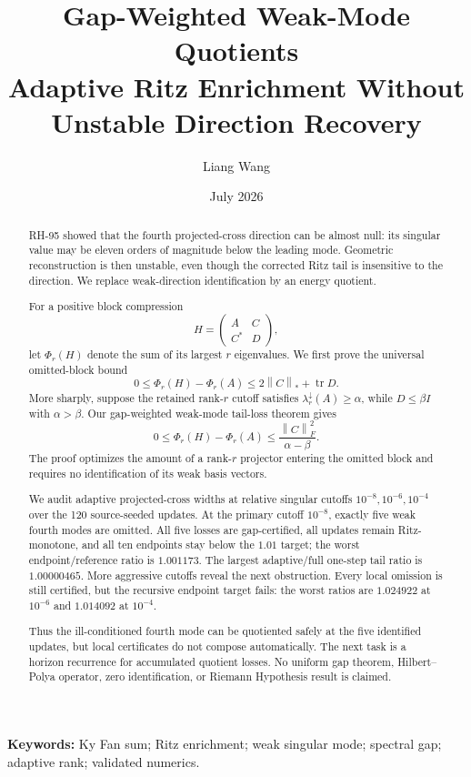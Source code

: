 \documentclass[11pt]{article}
\title{Gap-Weighted Weak-Mode Quotients\\
\large Adaptive Ritz Enrichment Without Unstable Direction Recovery}
\author{Liang Wang}
\date{July 2026}
\theoremstyle{definition}
\theoremstyle{remark}
\newcommand{\norm}[1]{\left\lVert#1\right\rVert}
\newcommand{\tr}{\operatorname{tr}}
\begin{document}
\maketitle

\begin{abstract}
RH-95 showed that the fourth projected-cross direction can be almost null:
its singular value may be eleven orders of magnitude below the leading mode.
Geometric reconstruction is then unstable, even though the corrected Ritz
tail is insensitive to the direction.  We replace weak-direction
identification by an energy quotient.

For a positive block compression
\[
 H=\begin{pmatrix}A&C\\C^*&D\end{pmatrix},
\]
let $\Phi_r(H)$ denote the sum of its largest $r$ eigenvalues.  We first prove
the universal omitted-block bound
\[
 0\le\Phi_r(H)-\Phi_r(A)
 \le 2\norm C_*+\tr D.
\]
More sharply, suppose the retained rank-$r$ cutoff satisfies
$\lambda_r^\downarrow(A)\ge\alpha$, while $D\le\beta I$ with
$\alpha>\beta$.  Our gap-weighted weak-mode tail-loss theorem gives
\[
 0\le\Phi_r(H)-\Phi_r(A)
 \le\frac{\norm C_F^2}{\alpha-\beta}.
\]
The proof optimizes the amount of a rank-$r$ projector entering the omitted
block and requires no identification of its weak basis vectors.

We audit adaptive projected-cross widths at relative singular cutoffs
$10^{-8},10^{-6},10^{-4}$ over the 120 source-seeded updates.  At the primary
cutoff $10^{-8}$, exactly five weak fourth modes are omitted.  All five losses
are gap-certified, all updates remain Ritz-monotone, and all ten endpoints
stay below the $1.01$ target; the worst endpoint/reference ratio is
$1.001173$.  The largest adaptive/full one-step tail ratio is $1.00000465$.
More aggressive cutoffs reveal the next obstruction.  Every local omission
is still certified, but the recursive endpoint target fails: the worst ratios
are $1.024922$ at $10^{-6}$ and $1.014092$ at $10^{-4}$.

Thus the ill-conditioned fourth mode can be quotiented safely at the five
identified updates, but local certificates do not compose automatically.
The next task is a horizon recurrence for accumulated quotient losses.  No
uniform gap theorem, Hilbert--Polya operator, zero identification, or Riemann
Hypothesis result is claimed.
\end{abstract}

\noindent\textbf{Keywords:} Ky Fan sum; Ritz enrichment; weak singular mode;
spectral gap; adaptive rank; validated numerics.
\end{document}
